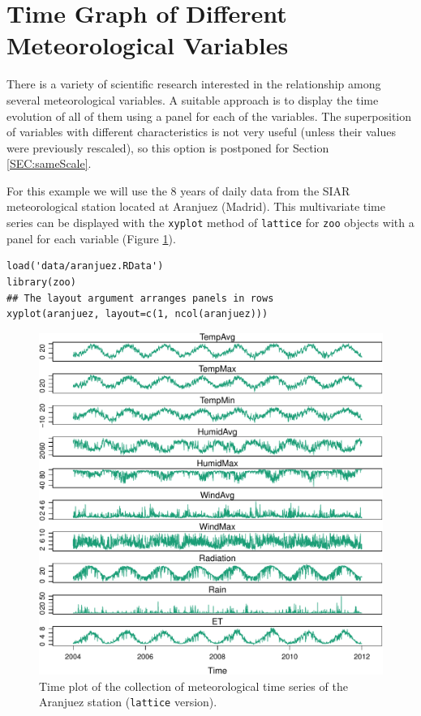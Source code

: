 \documentclass[smallroyalvopaper]{memoir}
\begin{document}
\section{Time Graph of Different Meteorological Variables}
\label{sec-1}
\label{sec:differentVariables}
There is a variety of scientific research interested in the
relationship among several meteorological variables. A suitable
approach is to display the time evolution of all of them using a
panel for each of the variables. The superposition of variables
with different characteristics is not very useful (unless their
values were previously rescaled), so this option is postponed for
Section \ref{SEC:sameScale}.

For this example we will use the 8 years of daily data from the
SIAR meteorological station located at Aranjuez (Madrid).  This
multivariate time series can be displayed with the \texttt{xyplot} method of
\texttt{lattice} for \texttt{zoo} objects with a panel for each variable (Figure
\ref{fig:aranjuezNaive}).

\lstset{language=R,numbers=none}
\begin{lstlisting}
load('data/aranjuez.RData')
library(zoo)
## The layout argument arranges panels in rows
xyplot(aranjuez, layout=c(1, ncol(aranjuez)))
\end{lstlisting}

\begin{figure}[htb]
\centering
\includegraphics[width=.9\linewidth]{figs/aranjuez.pdf}
\caption{\label{fig:aranjuezNaive}Time plot of the collection of meteorological time series of the Aranjuez station (\texttt{lattice} version).}
\end{figure}
\end{document}
